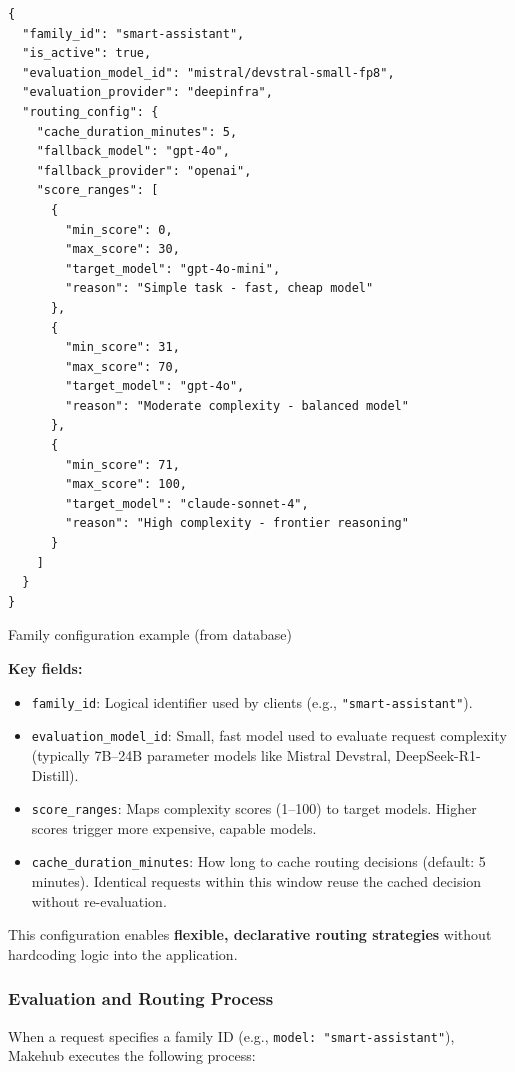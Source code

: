 \documentclass[english]{article}
\begin{document}
\begin{listing}[H]
\begin{verbatim}
{
  "family_id": "smart-assistant",
  "is_active": true,
  "evaluation_model_id": "mistral/devstral-small-fp8",
  "evaluation_provider": "deepinfra",
  "routing_config": {
    "cache_duration_minutes": 5,
    "fallback_model": "gpt-4o",
    "fallback_provider": "openai",
    "score_ranges": [
      {
        "min_score": 0,
        "max_score": 30,
        "target_model": "gpt-4o-mini",
        "reason": "Simple task - fast, cheap model"
      },
      {
        "min_score": 31,
        "max_score": 70,
        "target_model": "gpt-4o",
        "reason": "Moderate complexity - balanced model"
      },
      {
        "min_score": 71,
        "max_score": 100,
        "target_model": "claude-sonnet-4",
        "reason": "High complexity - frontier reasoning"
      }
    ]
  }
}
\end{verbatim}
\caption{Family configuration example (from database)}
\end{listing}

\textbf{Key fields:}
\begin{itemize}
    \item \texttt{family\_id}: Logical identifier used by clients (e.g., \texttt{"smart-assistant"}).
    \item \texttt{evaluation\_model\_id}: Small, fast model used to evaluate request complexity (typically 7B--24B parameter models like Mistral Devstral, DeepSeek-R1-Distill).
    \item \texttt{score\_ranges}: Maps complexity scores (1--100) to target models. Higher scores trigger more expensive, capable models.
    \item \texttt{cache\_duration\_minutes}: How long to cache routing decisions (default: 5 minutes). Identical requests within this window reuse the cached decision without re-evaluation.
\end{itemize}

This configuration enables \textbf{flexible, declarative routing strategies} without hardcoding logic into the application.

\subsubsection{Evaluation and Routing Process}

When a request specifies a family ID (e.g., \texttt{model: "smart-assistant"}), Makehub executes the following process:
\end{document}
